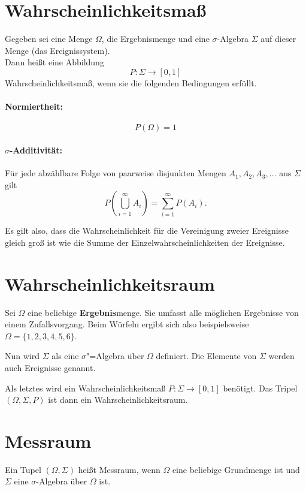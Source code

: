 \documentclass[paper=a4,10pt]{scrartcl}
\begin{document}
\section{Wahrscheinlichkeitsmaß}
Gegeben sei eine Menge $\Omega$, die Ergebnismenge und eine $\sigma$-Algebra $\Sigma$ auf dieser Menge (das Ereignissystem).\\

\noindent
Dann heißt eine Abbildung
\begin{equation}
P: \Sigma \rightarrow [0,1]
\end{equation}
Wahrscheinlichkeitsmaß, wenn sie die folgenden Bedingungen erfüllt.

\paragraph{Normiertheit:}
\begin{equation}
P(\Omega) = 1
\end{equation}

\paragraph{$\sigma$-Additivität:}
Für jede abzählbare Folge von paarweise disjunkten Mengen $A_1, A_2, A_3, \dots$ aus $\Sigma$ gilt
\begin{equation}
P\left( \bigcup^{\infty}_{i=1}A_i\right) = \sum_{i=1}^{\infty} P(A_i). 
\end{equation} 

\noindent
Es gilt also, dass die Wahrscheinlichkeit für die Vereinigung zweier Ereignisse gleich groß ist wie die Summe der Einzelwahrscheinlichkeiten der Ereignisse.

\section{Wahrscheinlichkeitsraum}
Sei $\Omega$ eine beliebige \textbf{Ergebnis}menge. Sie umfasst alle möglichen Ergebnisse von einem Zufallsvorgang. Beim Würfeln ergibt sich also beispielsweise $\Omega = \{ 1,2,3,4,5,6\}$.

\noindent
Nun wird $\Sigma$ als eine $\sigma$"=Algebra über $\Omega$ definiert. Die Elemente von $\Sigma$ werden auch Ereignisse genannt. 

\noindent
Als letztes wird ein Wahrscheinlichkeitsmaß $P: \Sigma \rightarrow [0,1]$ benötigt. Das Tripel $(\Omega, \Sigma, P)$ ist dann ein Wahrscheinlichkeitsraum.
 

\section{Messraum}
Ein Tupel $(\Omega, \Sigma)$ heißt Messraum, wenn $\Omega$ eine beliebige Grundmenge ist und $\Sigma$ eine $\sigma$-Algebra über $\Omega$ ist.
\end{document}
